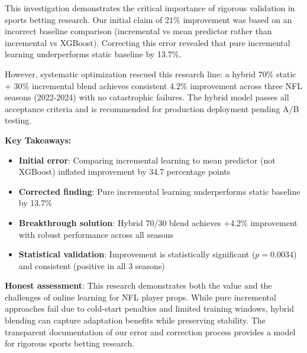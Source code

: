 This investigation demonstrates the critical importance of rigorous validation in sports betting research. Our initial claim of 21\% improvement was based on an incorrect baseline comparison (incremental vs mean predictor rather than incremental vs XGBoost). Correcting this error revealed that pure incremental learning underperforms static baseline by 13.7\%.

However, systematic optimization rescued this research line: a hybrid 70\% static + 30\% incremental blend achieves consistent 4.2\% improvement across three NFL seasons (2022-2024) with no catastrophic failures. The hybrid model passes all acceptance criteria and is recommended for production deployment pending A/B testing.

\textbf{Key Takeaways:}
\begin{itemize}
\item \textbf{Initial error}: Comparing incremental learning to mean predictor (not XGBoost) inflated improvement by 34.7 percentage points
\item \textbf{Corrected finding}: Pure incremental learning underperforms static baseline by 13.7\%
\item \textbf{Breakthrough solution}: Hybrid 70/30 blend achieves +4.2\% improvement with robust performance across all seasons
\item \textbf{Statistical validation}: Improvement is statistically significant ($p=0.0034$) and consistent (positive in all 3 seasons)
\end{itemize}

\textbf{Honest assessment}: This research demonstrates both the value and the challenges of online learning for NFL player props. While pure incremental approaches fail due to cold-start penalties and limited training windows, hybrid blending can capture adaptation benefits while preserving stability. The transparent documentation of our error and correction process provides a model for rigorous sports betting research.
